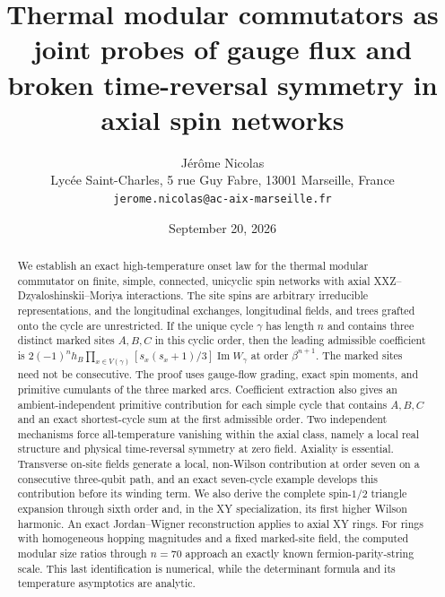 \documentclass[11pt]{article}
\newcommand{\affiliation}[1]{\\[0.25em]{\small #1}}
\newcommand{\email}[1]{\\{\small\texttt{#1}}}
\begin{document}
\title{Thermal modular commutators as joint probes of gauge flux and broken
time-reversal symmetry in axial spin networks}

\author{J\'er\^ome Nicolas%
\affiliation{Lyc\'ee Saint-Charles, 5 rue Guy Fabre, 13001 Marseille, France}%
\email{jerome.nicolas@ac-aix-marseille.fr}}

\date{September 20, 2026}

\maketitle

\begin{abstract}
We establish an exact high-temperature onset law for the thermal modular
commutator on finite, simple, connected, unicyclic spin networks with axial
XXZ--Dzyaloshinskii--Moriya interactions.  The site spins are arbitrary
irreducible representations, and the longitudinal exchanges, longitudinal
fields, and trees grafted onto the cycle are unrestricted.  If the unique
cycle $\gamma$ has length $n$ and contains three distinct marked sites
$A,B,C$ in this cyclic order, then the leading admissible coefficient is
$2(-1)^n h_B\prod_{x\in V(\gamma)}[s_x(s_x+1)/3]
\operatorname{Im}W_\gamma$
at order $\beta^{n+1}$.  The marked sites need not be consecutive.  The proof
uses gauge-flow grading, exact spin moments, and primitive cumulants of the
three marked arcs.  Coefficient extraction also gives an ambient-independent
primitive contribution for each simple cycle that contains $A,B,C$ and an
exact shortest-cycle sum at the first admissible order.  Two independent
mechanisms force all-temperature vanishing within the axial class, namely a
local real structure and physical time-reversal symmetry at zero field.
Axiality is essential.  Transverse on-site fields generate a local,
non-Wilson contribution at order seven on a consecutive three-qubit path,
and an exact seven-cycle example develops this contribution before its
winding term.  We also derive the complete spin-$1/2$ triangle expansion
through sixth order and, in the XY specialization, its first higher Wilson
harmonic.  An exact Jordan--Wigner reconstruction applies to axial XY rings.
For rings with homogeneous hopping magnitudes and a fixed marked-site field,
the computed modular size ratios through $n=70$ approach an exactly known
fermion-parity-string scale.  This last identification is numerical, while
the determinant formula and its temperature asymptotics are analytic.
\end{abstract}
\end{document}
